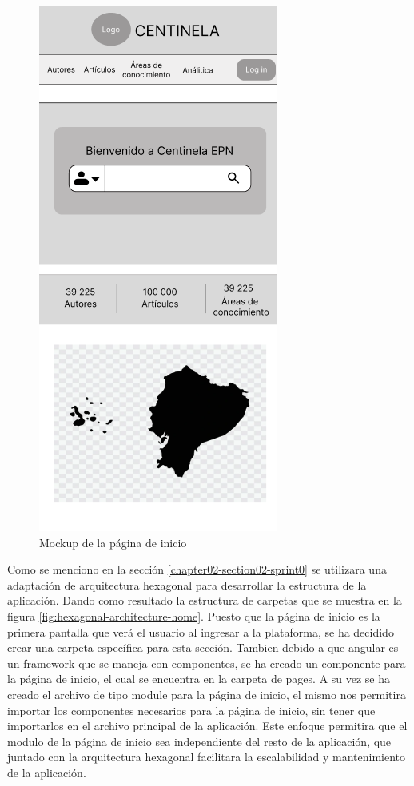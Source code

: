 \begin{figure}[H]
    \centering
    \includegraphics[scale=0.9]{../02Figures/02Chapter/Sprints/Sprint-1/mobile-first-home.png}
    \caption{Mockup de la página de inicio}
    \label{fig:mockup-home}
\end{figure}

Como se menciono en la sección \ref{chapter02-section02-sprint0} se utilizara una adaptación de arquitectura hexagonal para desarrollar la estructura de la aplicación.
Dando como resultado la estructura de carpetas que se muestra en la figura \ref{fig:hexagonal-architecture-home}.
Puesto que la página de inicio es la primera pantalla que verá el usuario al ingresar a la plataforma, se ha decidido crear una carpeta específica para esta sección.
Tambien debido a que angular es un framework que se maneja con componentes, se ha creado un componente para la página de inicio, el cual se encuentra en la carpeta de pages.
A su vez  se ha creado el archivo de tipo module para la página de inicio, el mismo nos permitira importar los componentes necesarios para la página de inicio, sin tener que importarlos en el archivo principal de la aplicación.
Este enfoque permitira que el modulo de la página de inicio sea independiente del resto de la aplicación, que juntado con la arquitectura hexagonal facilitara la escalabilidad y mantenimiento de la aplicación.

